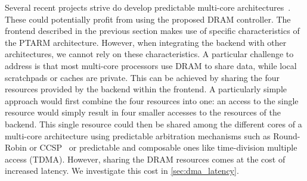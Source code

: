 Several recent projects strive do develop predictable multi-core architectures~\cite{Ungerer10, Wilhelm09, Schoeberl2008265, Hansson09}.
These  could potentially profit from using the proposed DRAM controller.
The frontend described in the previous section makes use of specific characteristics of the PTARM architecture.
However, when integrating the backend with other architectures, we cannot rely on these characteristics.
A particular challenge to address is that most multi-core processors use DRAM to share data, while local scratchpads or caches are private.
This can be achieved by sharing the four resources provided by the backend within the frontend.
A particularly simple approach would first combine the four resources into one:
an access to the single resource would simply result in four smaller accesses to the resources of the backend.
This single resource could then be shared among the different cores of a multi-core architecture using predictable arbitration mechanisms such as Round-Robin or CCSP~\cite{Akesson08} or predictable and composable ones like time-division multiple access (TDMA). 
However, sharing the DRAM resources comes at the cost of increased latency.
We investigate this cost in \ref{sec:dma_latency}.
